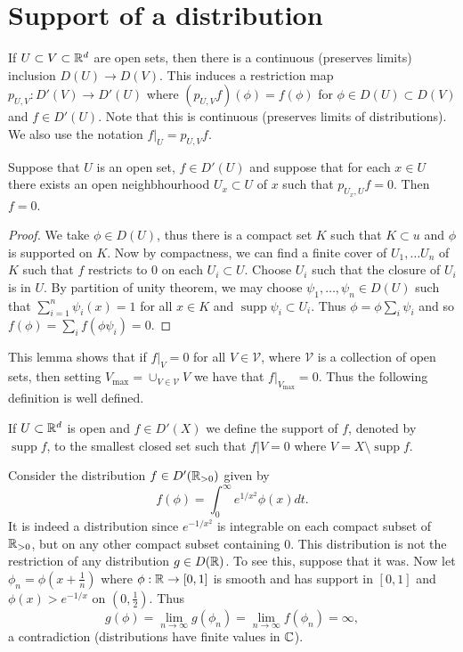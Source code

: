 \documentclass[twoside, a4paper, 10pt]{amsart}
\begin{document}
\section{Support of a distribution}

If $U \subset V \subset \mathbb{R}^d$ are open sets, then there is a continuous (preserves limits) inclusion $D(U) \to D(V)$. This induces a restriction map $p_{U,V}:D'(V) \to D'(U)$ where $(p_{U,V}f)(\phi) = f(\phi)$ for $\phi \in D(U) \subset D(V)$ and $f \in D'(U)$. Note that this is continuous (preserves limits of distributions). We also use the notation $f|_U = p_{U,V}f$.

\begin{lemma} Suppose that $U$ is an open set, $f \in D'(U)$ and suppose that for each $x \in U$ there exists an open neighbhourhood $U_x \subset U$ of $x$ such that $p_{U_x, U} f = 0$. Then $f=0$.

\end{lemma}

\begin{proof} We take $\phi \in D(U)$, thus there is a compact set $K$ such that $K \subset u$ and $\phi$ is supported on $K$. Now by compactness, we can find a finite cover of $U_1, \ldots U_n$ of $K$ such that $f$ restricts to $0$ on each $U_i \subset U$. Choose $U_i$ such that the closure of $U_i$ is in $U$. By partition of unity theorem, we may choose $\psi_1, \ldots, \psi_n \in D(U)$ such that $\sum_{i=1}^n \psi_i (x) = 1$ for all $x \in K$ and $\operatorname{supp} \psi_i \subset U_i$. Thus $\phi = \phi \sum_{i} \psi_i$ and so $f(\phi) = \sum_i f(\phi \psi_i) = 0.$ \end{proof}

This lemma shows that if $f|_V = 0$ for all $V \in \mathcal{V}$, where $\mathcal{V}$ is a collection of open sets, then setting $V_{\max} = \cup_{V \in \mathcal{V}} V$ we have that $f|_{V_{\max}} = 0$. Thus the following definition is well defined.

\begin{mydef} If $U \subset \mathbb{R}^d$ is open and $f \in D'(X)$ we define the support of $f$, denoted by $\operatorname{supp} f$, to the smallest closed set such that $f|V = 0$ where $V = X \setminus \operatorname{supp} f$.

\end{mydef}

\begin{eg} Consider the distribution $f \in D'(\mathbb{R}_{>0})$ given by $$f(\phi) = \int_0^{\infty} e^{1/x^2} \phi(x) dt.$$ It is indeed a distribution since $e^{-1/x^2}$ is integrable on each compact subset of $\mathbb{R}_{>0}$, but on any other compact subset containing $0$. This distribution is not the restriction of any distribution $g \in D(\mathbb{R})$. To see this, suppose that it was. Now let $\phi_n = \phi(x+\frac{1}{n})$ where $\phi:\mathbb{R} \to [0,1]$ is smooth and has support in $[0,1]$ and $\phi(x) > e^{-1/x}$ on $(0,\frac{1}{2})$. Thus $$g(\phi) = \lim_{n \to \infty} g(\phi_n) = \lim_{n \to \infty} f(\phi_n) = \infty,$$ a contradiction (distributions have finite values in $\mathbb{C}$).

\end{eg}
\end{document}
